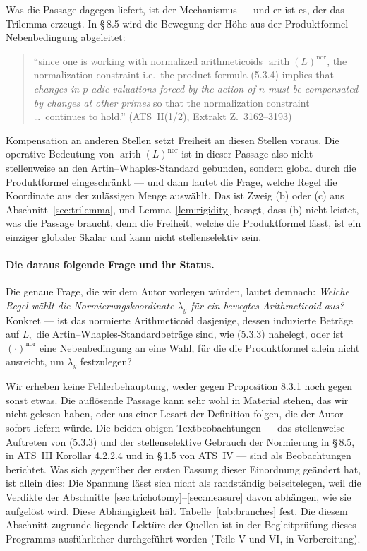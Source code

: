 \documentclass[11pt,a4paper]{article}
\theoremstyle{definition}
\theoremstyle{plain}
\theoremstyle{definition}
\newcommand{\arith}{\operatorname{arith}}
\newcommand{\anchor}[2]{(#1, Extrakt Z.~#2)}
\begin{document}
Was die Passage dagegen liefert, ist der Mechanismus --- und er ist es, der das
Trilemma erzeugt. In \S\,8.5 wird die Bewegung der Höhe aus der
Produktformel-Nebenbedingung abgeleitet:

\begin{quote}\small
``since one is working with normalized arithmeticoids $\arith(L)^{\mathrm{nor}}$,
the normalization constraint i.e.\ the product formula (5.3.4) implies that
\emph{changes in $p$-adic valuations forced by the action of $n$ must be
compensated by changes at other primes} so that the normalization constraint
\ldots\ continues to hold.'' \hfill\anchor{ATS~II(1/2)}{3162--3193}
\end{quote}

Kompensation an anderen Stellen setzt Freiheit an diesen Stellen voraus. Die
operative Bedeutung von $\arith(L)^{\mathrm{nor}}$ ist in dieser Passage also nicht
\glqq stellenweise an den Artin--Whaples-Standard gebunden\grqq{}, sondern
\glqq global durch die Produktformel eingeschränkt\grqq{} --- und dann lautet die
Frage, welche Regel die Koordinate aus der zulässigen Menge auswählt. Das ist Zweig
(b) oder (c) aus Abschnitt~\ref{sec:trilemma}, und Lemma~\ref{lem:rigidity} besagt,
dass (b) nicht leistet, was die Passage braucht, denn die Freiheit, welche die
Produktformel lässt, ist ein einziger globaler Skalar und kann nicht stellenselektiv
sein.

\paragraph{Die daraus folgende Frage und ihr Status.}
Die genaue Frage, die wir dem Autor vorlegen würden, lautet demnach: \emph{Welche
Regel wählt die Normierungskoordinate $\lambda_y$ für ein bewegtes Arithmeticoid
aus?} Konkret --- ist das normierte Arithmeticoid dasjenige, dessen induzierte
Beträge auf $L_v$ die Artin--Whaples-Standardbeträge sind, wie (5.3.3) nahelegt,
oder ist $(\cdot)^{\mathrm{nor}}$ eine Nebenbedingung an eine Wahl, für die die
Produktformel allein nicht ausreicht, um $\lambda_y$ festzulegen?

Wir erheben keine Fehlerbehauptung, weder gegen Proposition 8.3.1 noch gegen
sonst etwas. Die auflösende Passage kann sehr wohl in Material stehen, das wir nicht
gelesen haben, oder aus einer Lesart der Definition folgen, die der Autor sofort
liefern würde. Die beiden obigen Textbeobachtungen --- das stellenweise Auftreten
von (5.3.3) und der stellenselektive Gebrauch der Normierung in \S\,8.5, in ATS~III
Korollar 4.2.2.4 und in \S\,1.5 von ATS~IV --- sind als Beobachtungen berichtet. Was
sich gegenüber der ersten Fassung dieser Einordnung geändert hat, ist allein dies:
Die Spannung lässt sich nicht als randständig beiseitelegen, weil die Verdikte der
Abschnitte~\ref{sec:trichotomy}--\ref{sec:measure} davon abhängen, wie sie
aufgelöst wird. Diese Abhängigkeit hält Tabelle~\ref{tab:branches} fest. Die diesem
Abschnitt zugrunde liegende Lektüre der Quellen ist in der Begleitprüfung dieses
Programms ausführlicher durchgeführt worden (Teile V und VI, in Vorbereitung).
\end{document}
